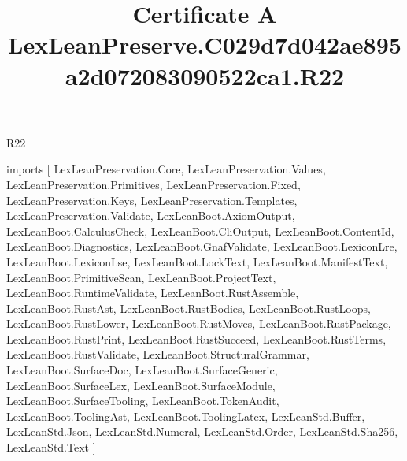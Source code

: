 \begin{lexlean}{R22}
\title{Certificate A LexLeanPreserve.C029d7d042ae895a2d072083090522ca1.R22}
\begin{coremodule}
imports [
  LexLeanPreservation.Core,
  LexLeanPreservation.Values,
  LexLeanPreservation.Primitives,
  LexLeanPreservation.Fixed,
  LexLeanPreservation.Keys,
  LexLeanPreservation.Templates,
  LexLeanPreservation.Validate,
  LexLeanBoot.AxiomOutput,
  LexLeanBoot.CalculusCheck,
  LexLeanBoot.CliOutput,
  LexLeanBoot.ContentId,
  LexLeanBoot.Diagnostics,
  LexLeanBoot.GnafValidate,
  LexLeanBoot.LexiconLre,
  LexLeanBoot.LexiconLse,
  LexLeanBoot.LockText,
  LexLeanBoot.ManifestText,
  LexLeanBoot.PrimitiveScan,
  LexLeanBoot.ProjectText,
  LexLeanBoot.RuntimeValidate,
  LexLeanBoot.RustAssemble,
  LexLeanBoot.RustAst,
  LexLeanBoot.RustBodies,
  LexLeanBoot.RustLoops,
  LexLeanBoot.RustLower,
  LexLeanBoot.RustMoves,
  LexLeanBoot.RustPackage,
  LexLeanBoot.RustPrint,
  LexLeanBoot.RustSucceed,
  LexLeanBoot.RustTerms,
  LexLeanBoot.RustValidate,
  LexLeanBoot.StructuralGrammar,
  LexLeanBoot.SurfaceDoc,
  LexLeanBoot.SurfaceGeneric,
  LexLeanBoot.SurfaceLex,
  LexLeanBoot.SurfaceModule,
  LexLeanBoot.SurfaceTooling,
  LexLeanBoot.TokenAudit,
  LexLeanBoot.ToolingAst,
  LexLeanBoot.ToolingLatex,
  LexLeanStd.Buffer,
  LexLeanStd.Json,
  LexLeanStd.Numeral,
  LexLeanStd.Order,
  LexLeanStd.Sha256,
  LexLeanStd.Text
]


\end{coremodule}
\end{lexlean}
